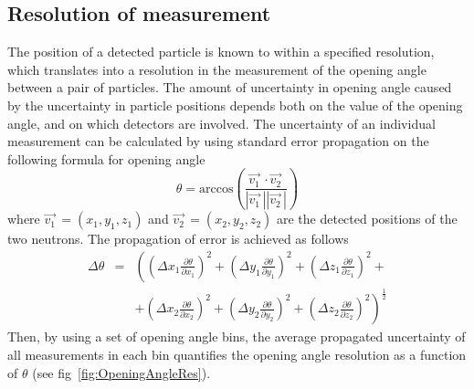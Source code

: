 \subsection{Resolution of measurement}
The position of a detected particle is known to within a specified resolution, which translates into a resolution in the measurement of the opening angle between a pair of particles.
The amount of uncertainty in opening angle caused by the uncertainty in particle positions depends both on the value of the opening angle, and on which detectors are involved.
The uncertainty of an individual measurement can be calculated by using standard error propagation on the following formula for opening angle
\begin{displaymath}
    \theta = \text{arccos}\left(\frac{\vec{v_{1}}^{\,}\cdot\vec{v_{2}}^{\,}}{|\vec{v_{1}}^{\,}||\vec{v_{2}}^{\,}|}\right)
\end{displaymath}
where $\vec{v_{1}}^{\,} = (x_1,y_1,z_1)$ and $\vec{v_{2}}^{\,} = (x_2,y_2,z_2)$ are the detected positions of the two neutrons.
The propagation of error is achieved as follows
\begin{eqnarray*}
 \Delta \theta & = & \left( \left(\Delta x_1 \frac{\partial \theta}{\partial x_1}\right)^{2} + \left(\Delta y_1 \frac{\partial \theta}{\partial y_1}\right)^{2} + \left(\Delta z_1 \frac{\partial \theta}{\partial z_1}\right)^{2} + \right. \\
 & & \left. + \left(\Delta x_2 \frac{\partial \theta}{\partial x_2}\right)^{2} + \left(\Delta y_2\frac{\partial \theta}{\partial y_2}\right)^{2} + \left(\Delta z_2 \frac{\partial \theta}{\partial z_2}\right)^{2} \right) ^{\frac{1}{2}}
\end{eqnarray*}
Then, by using a set of opening angle bins, the average propagated uncertainty of all measurements in each bin quantifies the opening angle resolution as a function of $\theta$ (see fig~\ref{fig:OpeningAngleRes}).
